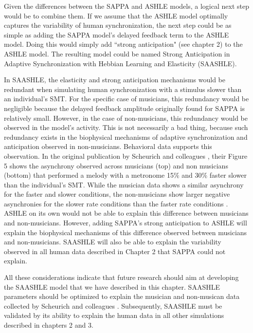 \documentclass{report}
\begin{document}
Given the differences between the SAPPA and ASHLE models, a logical next step would be to combine them. If we assume that the ASHLE model optimally captures the variability of human synchronization, the next step could be as simple as adding the SAPPA model's delayed feedback term to the ASHLE model. Doing this would simply add ``strong anticipation" (see chapter 2) to the ASHLE model. The resulting model could be named Strong Anticipation in Adaptive Synchronization with Hebbian Learning and Elasticity (SAASHLE). 

In SAASHLE, the elasticity and strong anticipation mechanisms would be redundant when simulating human synchronization with a stimulus slower than an individual's SMT. For the specific case of musicians, this redundancy would be negligible because the delayed feedback amplitude originally found for SAPPA is relatively small. However, in the case of non-musicians, this redundancy would be observed in the model's activity. This is not necessarily a bad thing, because such redundancy exists in the biophysical mechanisms of adaptive synchronization and anticipation observed in non-musicians. Behavioral data supports this observation. In the original publication by Scheurich and colleagues \cite{scheurich2018tapping}, their Figure 5 shows the asynchrony observed across musicians (top) and non musicians (bottom) that performed a melody with a metronome 15\% and 30\% faster slower than the individual's SMT. While the musician data shows a similar asynchrony for the faster and slower conditions, the non-musicians show larger negative asynchronies for the slower rate conditions than the faster rate conditions \cite{scheurich2018tapping}. ASHLE on its own would not be able to explain this difference between musicians and non-musicians. However, adding SAPPA's strong anticipation to ASHLE will explain the biophysical mechanisms of this difference observed between musicians and non-musicians. SAASHLE will also be able to explain the variability observed in all human data described in Chapter 2 that SAPPA could not explain. 

All these considerations indicate that future research should aim at developing the SAASHLE model that we have described in this chapter. SAASHLE parameters should be optimized to explain the musician and non-musican data collected by Scheurich and colleagues \cite{scheurich2018tapping}. Subsequently, SAASHLE must be validated by its ability to explain the human data in all other simulations described in chapters 2 and 3. 
\end{document}
